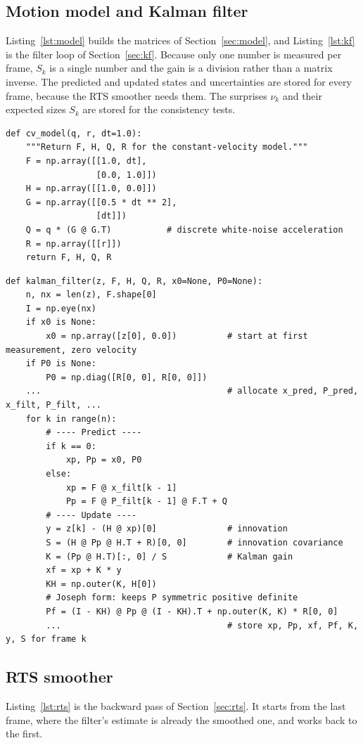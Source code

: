 \documentclass[11pt,a4paper]{article}
\begin{document}
\subsection{Motion model and Kalman filter}
Listing~\ref{lst:model} builds the matrices of Section~\ref{sec:model}, and
Listing~\ref{lst:kf} is the filter loop of Section~\ref{sec:kf}. Because only one number is
measured per frame, $S_k$ is a single number and the gain is a division rather than a matrix
inverse. The predicted and updated states and uncertainties are stored for every frame,
because the RTS smoother needs them. The surprises $\nu_k$ and their expected sizes $S_k$ are
stored for the consistency tests.

\begin{lstlisting}[caption={Constant-velocity motion model (\texttt{kalman.py}).},label=lst:model]
def cv_model(q, r, dt=1.0):
    """Return F, H, Q, R for the constant-velocity model."""
    F = np.array([[1.0, dt],
                  [0.0, 1.0]])
    H = np.array([[1.0, 0.0]])
    G = np.array([[0.5 * dt ** 2],
                  [dt]])
    Q = q * (G @ G.T)           # discrete white-noise acceleration
    R = np.array([[r]])
    return F, H, Q, R
\end{lstlisting}

\begin{lstlisting}[caption={Kalman filter predict and update loop (\texttt{kalman.py}).},label=lst:kf]
def kalman_filter(z, F, H, Q, R, x0=None, P0=None):
    n, nx = len(z), F.shape[0]
    I = np.eye(nx)
    if x0 is None:
        x0 = np.array([z[0], 0.0])          # start at first measurement, zero velocity
    if P0 is None:
        P0 = np.diag([R[0, 0], R[0, 0]])
    ...                                     # allocate x_pred, P_pred, x_filt, P_filt, ...
    for k in range(n):
        # ---- Predict ----
        if k == 0:
            xp, Pp = x0, P0
        else:
            xp = F @ x_filt[k - 1]
            Pp = F @ P_filt[k - 1] @ F.T + Q
        # ---- Update ----
        y = z[k] - (H @ xp)[0]              # innovation
        S = (H @ Pp @ H.T + R)[0, 0]        # innovation covariance
        K = (Pp @ H.T)[:, 0] / S            # Kalman gain
        xf = xp + K * y
        KH = np.outer(K, H[0])
        # Joseph form: keeps P symmetric positive definite
        Pf = (I - KH) @ Pp @ (I - KH).T + np.outer(K, K) * R[0, 0]
        ...                                 # store xp, Pp, xf, Pf, K, y, S for frame k
\end{lstlisting}

\subsection{RTS smoother}
Listing~\ref{lst:rts} is the backward pass of Section~\ref{sec:rts}. It starts from the last
frame, where the filter's estimate is already the smoothed one, and works back to the first.
\end{document}
